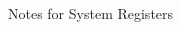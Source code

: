 \documentclass{sheet}
\begin{document}
\begin{multicols}{3}
\begin{table-lX}{Notes for System Registers}
\end{table-lX}
%
%
\end{multicols}
\end{document}
